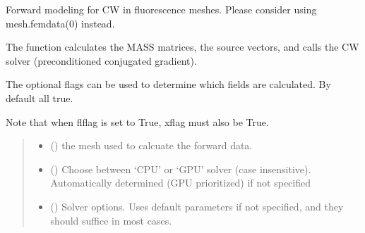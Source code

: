 \documentclass[letterpaper,10pt,english]{sphinxmanual}
\begin{document}
\begin{fulllineitems}
\label{\detokenize{_autosummary/nirfasterff.forward.femdata.femdata_fl_CW:nirfasterff.forward.femdata.femdata_fl_CW}}
\pysigstartsignatures
{}
\pysigstopsignatures
\sphinxAtStartPar
Forward modeling for CW in fluorescence meshes. Please consider using mesh.femdata(0) instead.

\sphinxAtStartPar
The function calculates the MASS matrices, the source vectors, and calls the CW solver (preconditioned conjugated gradient).

\sphinxAtStartPar
The optional flags can be used to determine which fields are calculated. By default all true.

\sphinxAtStartPar
Note that when flflag is set to True, xflag must also be True.
\begin{quote}\begin{description}
\begin{itemize}
\item {} 
\sphinxAtStartPar
{} () \textendash{} the mesh used to calcuate the forward data.

\item {} 
\sphinxAtStartPar
{} (\sphinxstyleliteralemphasis{\sphinxupquote{, }}) \textendash{} Choose between ‘CPU’ or ‘GPU’ solver (case insensitive). Automatically determined (GPU prioritized) if not specified

\item {} 
\sphinxAtStartPar
{} ({\hyperref[\detokenize{_autosummary/nirfasterff.utils.SolverOptions:nirfasterff.utils.SolverOptions}]{}}\sphinxstyleliteralemphasis{\sphinxupquote{, }}) \textendash{} 
\sphinxAtStartPar
Solver options. Uses default parameters if not specified, and they should suffice in most cases.


\end{itemize}
\end{description}
\end{quote}
\end{fulllineitems}
\end{document}
